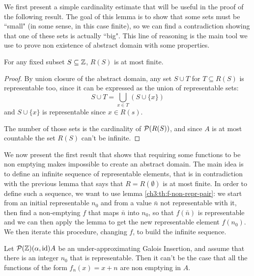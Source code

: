 We first present a simple cardinality estimate that will be useful in the proof of the following result. The goal of this lemma is to show that some sets must be ``small" (in some sense, in this case finite), so we can find a contradiction showing that one of these sets is actually ``big". This line of reasoning is the main tool we use to prove non existence of abstract domain with some properties.

\begin{lemma}\label{ch3:th:R-S-bound-integer-inf}
	For any fixed subset $S \subseteq \mathbb{Z}$, $R(S)$ is at most finite.
\end{lemma}
\begin{proof}
	By union closure of the abstract domain, any set $S \cup T$ for $T \subseteq R(S)$ is representable too, since it can be expressed as the union of representable sets:
	\[
	S \cup T = \bigcup\limits_{x \in T} (S \cup \{ x \})
	\]
	and $S \cup \{ x \}$ is representable since $x \in R(s)$.

	The number of those sets is the cardinality of $\mathcal{P}(R(S))$, and since $A$ is at most countable the set $R(S)$ can't be infinite.
\end{proof}

We now present the first result that shows that requiring some functions to be non emptying makes impossible to create an abstract domain. The main idea is to define an infinite sequence of representable elements, that is in contradiction with the previous lemma that says that $R = R(\emptyset)$ is at most finite.
In order to define such a sequence, we want to use lemma \ref{ch3:th:f-non-repr-pair}: we start from an initial representable $n_0$ and from a value $\bar{n}$ not representable with it, then find a non-emptying $f$ that maps $\bar{n}$ into $n_0$, so that $f(\bar{n})$ is representable and we can then apply the lemma to get the new representable element $f(n_0)$. We then iterate this procedure, changing $f$, to build the infinite sequence.

\begin{prop}\label{ch3:th:ne-sum-nonexsistence-inf}
	Let $\mathcal{P}(\mathbb{Z}) (\alpha, \text{id}) A$ be an under-approximating Galois Insertion, and assume that there is an integer $n_0$ that is representable. Then it can't be the case that all the functions of the form $f_n(x) = x + n$ are non emptying in $A$.
\end{prop}

